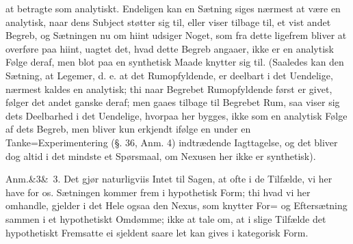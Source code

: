 \documentclass[12pt]{book}
\def\sperr#1{#1}%
\def\textit#1{#1}%
\newcommand{\sperr}[1]{\textls[180]{#1}}
\newcommand{\anm}[1]{%
  \par\vspace{0.5\baselineskip}%
  \noindent\hspace{\parindent}\sperr{Anm.}\ifx&#1&\else~\textit{#1}.\fi
  \enspace\ignorespaces
}
\newcommand{\opage}[1]{\marginnote{\footnotesize\textit{[#1]}}}
\begin{document}
\opage{310} at betragte som analytiskt. Endeligen kan en Sætning siges nærmest at være en
analytisk, naar dens Subject støtter sig til, eller viser tilbage til, et vist
andet Begreb, og Sætningen nu om hiint udsiger Noget, som fra dette ligefrem
bliver at overføre paa hiint, uagtet det, hvad dette Begreb angaaer, ikke er en
analytisk Følge deraf, men blot paa en synthetisk Maade knytter sig til.
(Saaledes kan den Sætning, at Legemer, d. e. at det Rumopfyldende, er deelbart i
det Uendelige, nærmest kaldes en analytisk; thi naar Begrebet Rumopfyldende
først er givet, følger det andet ganske deraf; men gaaes tilbage til Begrebet
Rum, saa viser sig dets Deelbarhed i det Uendelige, hvorpaa her bygges, ikke som
en analytisk Følge af dets Begreb, men bliver kun erkjendt ifølge en under en
Tanke=Experimentering (§. 36, Anm. 4) indtrædende Iagttagelse, og det bliver dog
altid i det mindste et Spørsmaal, om Nexusen her ikke er synthetisk).

\anm{3} Det gjør naturligviis Intet til Sagen, at ofte i de Tilfælde, vi her
have for os. Sætningen kommer frem i hypothetisk Form; thi hvad vi her omhandle,
gjelder i det Hele ogsaa den Nexus, som knytter For= og Eftersætning sammen i et
hypothetiskt Omdømme; ikke at tale om, at i slige Tilfælde det hypothetiskt
Fremsatte ei sjeldent saare let kan gives i kategorisk Form.
\end{document}
